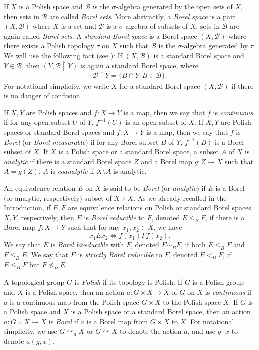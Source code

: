 \documentclass{amsart}
\theoremstyle{definition}
\theoremstyle{problem}
\theoremstyle{remark}
\numberwithin{equation}{section}
\begin{document}
If $X$ is a Polish space and $\mathcal{B}$ is the $\sigma$-algebra generated by the open sets of $X$,  then sets in $\mathcal{B}$ are called {\em Borel sets}. More abstractly, a {\em Borel space} is a pair $(X, \mathcal{B})$ where $X$ is a set and $\mathcal{B}$ is a $\sigma$-algebra of subsets of $X$; sets in $\mathcal{B}$ are again called {\em Borel sets}. A {\em standard Borel space} is a Borel space $(X, \mathcal{B})$ where there exists a Polish topology $\tau$ on $X$ such that $\mathcal{B}$ is the $\sigma$-algebra generated by $\tau$. We will use the following fact (see \cite[Corollary 13.4]{KechrisBook}): If $(X, \mathcal{B})$ is a standard Borel space and $Y\in \mathcal{B}$, then $(Y, \mathcal{B}\upharpoonright Y)$ is again a standard Borel space, where 
$$ \mathcal{B}\upharpoonright Y=\{ B\cap Y\colon B\in\mathcal{B}\}. $$
For notational simplicity, we write $X$ for a standard Borel space $(X, \mathcal{B})$ if there is no danger of confusion.

If $X, Y$ are Polish spaces and $f\colon X\to Y$ is a map, then we say that $f$ is {\em continuous} if for any open subset $U$ of $Y$, $f^{-1}(U)$ is an open subset of $X$. If $X, Y$ are Polish spaces or standard Borel spaces and $f\colon X\to Y$ is a map, then we say that $f$ is {\em Borel} (or {\em Borel measurable}) if for any Borel subset $B$ of $Y$, $f^{-1}(B)$ is a Borel subset of $X$. If $X$ is a Polish space or a standard Borel space, a subset $A$ of $X$ is {\em analytic} if there is a standard Borel space $Z$ and a Borel map $g\colon Z\to X$ such that $A=g(Z)$; $A$ is {\em coanalytic} if $X\setminus A$ is analytic. %

An equivalence relation $E$ on $X$ is said to be {\em Borel} (or {\em analytic}) if $E$ is a Borel (or  analytic, respectively) subset of $X\times X$. As we already recalled in the Introduction, if $E, F$ are equivalence relations on Polish or standard Borel spaces $X, Y$, respectively, then $E$ is {\em Borel reducible} to $F$, denoted $E\leq_B F$, if there is a Borel map $f\colon X\to Y$ such that for any $x_1, x_2\in X$, we have
$$ x_1Ex_2\iff f(x_1)Ff(x_2). $$
We say that $E$ is {\em Borel bireducible} with $F$, denoted $E\sim_B F$, if both $E\leq_B F$ and $F\leq_B E$. We say that $E$ is {\em strictly Borel reducible} to $F$, denoted $E<_B F$, if $E\leq_BF$ but $F\not\leq_B E$.

A topological group $G$ is {\em Polish} if its topology is Polish. If $G$ is a Polish group and $X$ is a Polish space, then an action $a\colon G\times X\to X$ of $G$ on $X$ is {\em continuous} if $a$ is a continuous map from the Polish space $G\times X$ to the Polish space $X$. If $G$ is a Polish space and $X$ is a Polish space or a standard Borel space, then an action $a\colon G\times X \to X$ is {\em Borel} if $a$ is a Borel map from $G\times X$ to $X$. For notational simplicity, we use $G\curvearrowright_a X$ or $G\curvearrowright X$ to denote the action $a$, and use $g\cdot x$ to denote $a(g, x)$.
\end{document}
